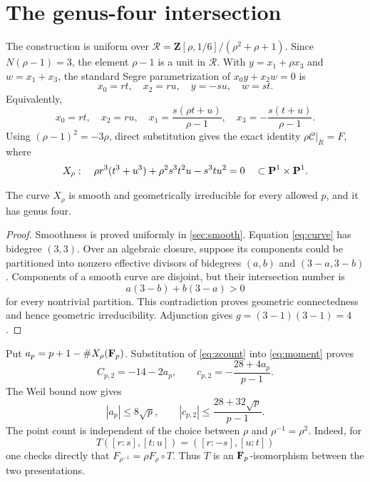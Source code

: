 \section{The genus-four intersection}

The construction is uniform over
\(\mathcal R=\mathbf Z[\rho,1/6]/(\rho^2+\rho+1)\).  Since
\(N(\rho-1)=3\), the element \(\rho-1\) is a unit in \(\mathcal R\).
With \(y=x_1+\rho x_3\) and \(w=x_1+x_3\), the standard Segre
parametrization of \(x_0y+x_2w=0\) is
\[
 x_0=rt,\quad x_2=ru,\quad y=-su,\quad w=st.
\]
Equivalently,
\[
x_0=rt,\quad x_2=ru,\quad
x_1=\frac{s(\rho t+u)}{\rho-1},\quad
x_3=-\frac{s(t+u)}{\rho-1}.
\]
Using \((\rho-1)^2=-3\rho\), direct substitution gives the exact identity
\(\rho\mathcal C|_R=F\), where
\begin{equation}\label{eq:curve}
 X_\rho:\quad
 \rho r^3(t^3+u^3)+\rho^2s^3t^2u-s^3tu^2=0
 \quad\subset\mathbf P^1\times\mathbf P^1.
\end{equation}

\begin{proposition}\label{prop:smooth}
The curve \(X_\rho\) is smooth and geometrically irreducible for every
allowed \(p\), and it has genus four.
\end{proposition}

\begin{proof}
Smoothness is proved uniformly in \cref{sec:smooth}.  Equation
\eqref{eq:curve} has bidegree \((3,3)\).  Over an algebraic closure, suppose
its components could be partitioned into nonzero effective divisors of
bidegrees \((a,b)\) and \((3-a,3-b)\).  Components of a smooth curve are
disjoint, but their intersection number is
\[
 a(3-b)+b(3-a)>0
\]
for every nontrivial partition.  This contradiction proves geometric
connectedness and hence geometric irreducibility.  Adjunction
\cite[Chapter~V, Section~1, Proposition~1.5 and Example~1.5.2]{Hartshorne1977}
gives
\(g=(3-1)(3-1)=4\).
\end{proof}

Put \(a_p=p+1-\#X_\rho(\mathbf F_p)\).  Substitution of \eqref{eq:zcount} into
\eqref{eq:moment} proves
\begin{equation}\label{eq:ap}
 \boxed{C_{p,2}=-14-2a_p},
 \qquad
 \boxed{c_{p,2}=-\frac{28+4a_p}{p-1}}.
\end{equation}
The Weil bound now gives
\begin{equation}\label{eq:weil}
 |a_p|\le8\sqrt p,
 \qquad
 |c_{p,2}|\le\frac{28+32\sqrt p}{p-1}.
\end{equation}
The point count is independent of the choice between \(\rho\) and
\(\rho^{-1}=\rho^2\).  Indeed, for
\[
 T([r:s],[t:u])=([r:-s],[u:t])
\]
one checks directly that \(F_{\rho^{-1}}=\rho F_\rho\circ T\).  Thus \(T\)
is an \(\mathbf F_p\)-isomorphism between the two presentations.
